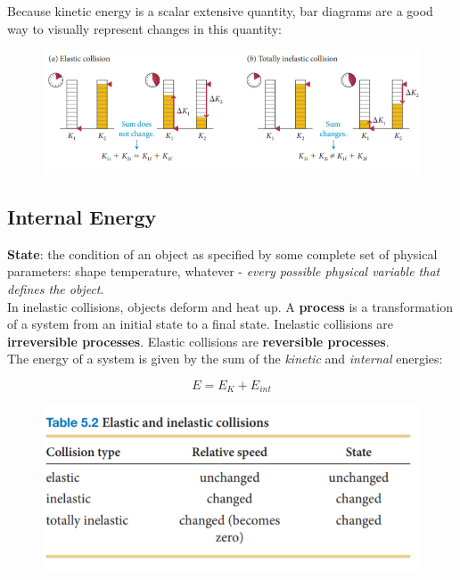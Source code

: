         Because kinetic energy is a scalar extensive quantity, bar diagrams are a good way to visually represent changes in this quantity:

        \begin{figure}[hbt!]
            \centering
            \includegraphics[]{Resources/Kinetic_Energy}
        \end{figure}



    \subsection{Internal Energy}

        \textbf{State}: the condition of an object as specified by some complete set of physical parameters: shape temperature, whatever - \textit{every possible physical variable that defines the object}. \\
        In inelastic collisions, objects deform and heat up. A \textbf{process} is a transformation of a system from an initial state to a final state. Inelastic collisions are \textbf{irreversible processes}.
        Elastic collisions are \textbf{reversible processes}. \\

        The energy of a system is given by the sum of the \textit{kinetic} and \textit{internal} energies:

        \[
            E = E_K + E_{int}
        \]

        \begin{figure}[hbt!]
            \centering
            \includegraphics[scale=0.5]{Resources/Collisions}
        \end{figure}

